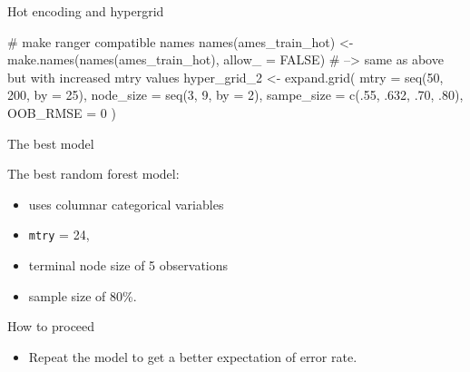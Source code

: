 \documentclass[
  10pt,
  ignorenonframetext,
]{beamer}
\newenvironment{Shaded}{}{}
\newcommand{\CommentTok}[1]{\textcolor[rgb]{0.00,0.50,0.00}{#1}}
\newcommand{\DataTypeTok}[1]{#1}
\newcommand{\DecValTok}[1]{#1}
\newcommand{\FloatTok}[1]{#1}
\newcommand{\KeywordTok}[1]{\textcolor[rgb]{0.00,0.00,1.00}{#1}}
\newcommand{\NormalTok}[1]{#1}
\newcommand{\OtherTok}[1]{\textcolor[rgb]{1.00,0.25,0.00}{#1}}
\newcommand{\StringTok}[1]{\textcolor[rgb]{0.00,0.50,0.50}{#1}}
\providecommand{\tightlist}{%
  \setlength{\itemsep}{0pt}\setlength{\parskip}{0pt}}
\begin{document}
\begin{frame}[fragile]{Hot encoding and hypergrid}
\protect\hypertarget{hot-encoding-and-hypergrid}{}

\begin{Shaded}
\begin{Highlighting}[]
\CommentTok{# make ranger compatible names}
\KeywordTok{names}\NormalTok{(ames_train_hot) <-}\StringTok{ }\KeywordTok{make.names}\NormalTok{(}\KeywordTok{names}\NormalTok{(ames_train_hot), }
                                    \DataTypeTok{allow_ =} \OtherTok{FALSE}\NormalTok{)}
\CommentTok{# --> same as above but with increased mtry values}
\NormalTok{hyper_grid_}\DecValTok{2}\NormalTok{ <-}\StringTok{ }\KeywordTok{expand.grid}\NormalTok{(}
  \DataTypeTok{mtry       =} \KeywordTok{seq}\NormalTok{(}\DecValTok{50}\NormalTok{, }\DecValTok{200}\NormalTok{, }\DataTypeTok{by =} \DecValTok{25}\NormalTok{),}
  \DataTypeTok{node_size  =} \KeywordTok{seq}\NormalTok{(}\DecValTok{3}\NormalTok{, }\DecValTok{9}\NormalTok{, }\DataTypeTok{by =} \DecValTok{2}\NormalTok{),}
  \DataTypeTok{sampe_size =} \KeywordTok{c}\NormalTok{(.}\DecValTok{55}\NormalTok{, }\FloatTok{.632}\NormalTok{, }\FloatTok{.70}\NormalTok{, }\FloatTok{.80}\NormalTok{),}
  \DataTypeTok{OOB_RMSE  =} \DecValTok{0}
\NormalTok{)}
\end{Highlighting}
\end{Shaded}

\end{frame}

\begin{frame}[fragile]{The best model}
\protect\hypertarget{the-best-model}{}

\begin{block}{The best random forest model:}

\begin{itemize}
\tightlist
\item
  uses columnar categorical variables
\item
  \texttt{mtry} = 24,
\item
  terminal node size of 5 observations
\item
  sample size of 80\%.
\end{itemize}

\end{block}

\begin{block}{How to proceed}

\begin{itemize}
\tightlist
\item
  Repeat the model to get a better expectation of error rate.
\end{itemize}

\end{block}

\end{frame}
\end{document}

